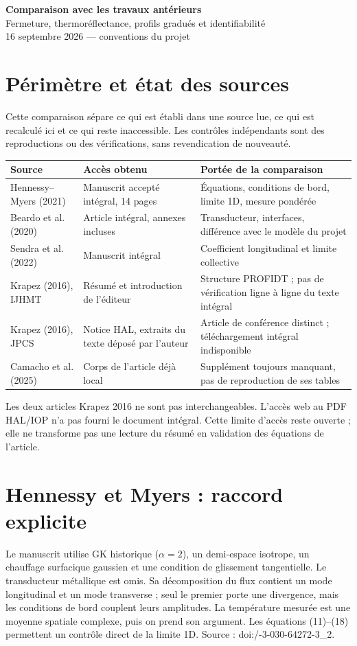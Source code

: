 \documentclass[11pt,a4paper]{article}
\begin{document}
\begin{center}
{\Large\bfseries Comparaison avec les travaux antérieurs}\\[4pt]
{\normalsize Fermeture, thermoréflectance, profils gradués et identifiabilité}\\[2pt]
{\small 16 septembre 2026 --- conventions du projet}
\end{center}

\section{Périmètre et état des sources}
Cette comparaison sépare ce qui est établi dans une source lue, ce qui est
recalculé ici et ce qui reste inaccessible. Les contrôles indépendants sont
des reproductions ou des vérifications, sans revendication de nouveauté.

\begin{center}
\begin{tabularx}{\textwidth}{@{}lXX@{}}
\toprule
Source & Accès obtenu & Portée de la comparaison\\
\midrule
Hennessy--Myers (2021) & Manuscrit accepté intégral, 14 pages &
Équations, conditions de bord, limite 1D, mesure pondérée\\
Beardo et al. (2020) & Article intégral, annexes incluses &
Transducteur, interfaces, différence avec le modèle du projet\\
Sendra et al. (2022) & Manuscrit intégral & Coefficient longitudinal et limite collective\\
Krapez (2016), IJHMT & Résumé et introduction de l'éditeur &
Structure PROFIDT ; pas de vérification ligne à ligne du texte intégral\\
Krapez (2016), JPCS & Notice HAL, extraits du texte déposé par l'auteur &
Article de conférence distinct ; téléchargement intégral indisponible\\
Camacho et al. (2025) & Corps de l'article déjà local &
Supplément toujours manquant, pas de reproduction de ses tables\\
\bottomrule
\end{tabularx}
\end{center}
Les deux articles Krapez 2016 ne sont pas interchangeables.
L'accès web au PDF HAL/IOP n'a pas fourni le document intégral.
Cette limite d'accès reste ouverte ; elle ne transforme pas une lecture
du résumé en validation des équations de l'article.

\section{Hennessy et Myers : raccord explicite}
Le manuscrit utilise GK historique ($\alpha=2$), un demi-espace isotrope,
un chauffage surfacique gaussien et une condition de glissement tangentielle.
Le transducteur métallique est omis. Sa décomposition du flux contient un mode
longitudinal et un mode transverse ; seul le premier porte une divergence,
mais les conditions de bord couplent leurs amplitudes. La température mesurée
est une moyenne spatiale complexe, puis on prend son argument.
Les équations (11)--(18) permettent un contrôle direct de la limite 1D.
Source : doi:/-3-030-64272-3\_2.
\end{document}
